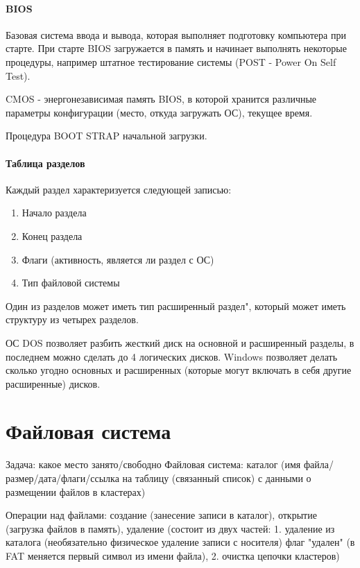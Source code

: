 \documentclass[]{article}
\begin{document}
			\paragraph{BIOS} Базовая система ввода и вывода, которая выполняет подготовку компьютера при старте. При старте BIOS загружается в память и начинает выполнять некоторые процедуры, например штатное тестирование системы (POST - Power On Self Test). 
			
			CMOS - энергонезависимая память BIOS, в которой хранится различные параметры конфигурации (место, откуда загружать ОС), текущее время.
			
			Процедура BOOT STRAP начальной загрузки.
			
			\paragraph{Таблица разделов}
			Каждый раздел характеризуется следующей записью:
			\begin{enumerate}
				\item Начало раздела
				\item Конец раздела
				\item Флаги (активность, является ли раздел с ОС)
				\item Тип файловой системы
			\end{enumerate}
			
			Один из разделов может иметь тип расширенный раздел", который может иметь структуру из четырех разделов.
			
			ОС DOS позволяет разбить жесткий диск на основной и расширенный разделы, в последнем можно сделать до 4 логических дисков. Windows позволяет делать сколько угодно основных и расширенных (которые могут включать в себя другие расширенные) дисков.
	\section{Файловая система}
		Задача: какое место занято/свободно
		Файловая система: каталог (имя файла/размер/дата/флаги/ссылка на таблицу (связанный список) с данными о размещении файлов в кластерах)
		
		Операции над файлами: создание (занесение записи в каталог), открытие (загрузка файлов в память), удаление (состоит из двух частей: 1. удаление из каталога (необязательно физическое удаление записи с носителя) флаг "удален" (в FAT меняется первый символ из имени файла), 2. очистка цепочки кластеров)
		
\end{document}
